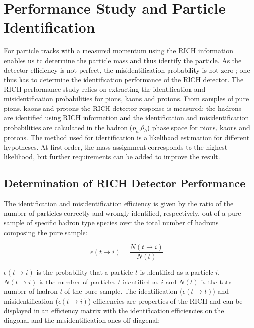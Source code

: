 
\chapter{Performance Study and Particle Identification}
\label{ch:PID} %


For particle tracks with a measured momentum using the RICH information enables us to determine the particle mass and thus identify the particle. As the detector efficiency is not perfect, the misidentification probability is not zero ; one thus has to determine the identification performance of the RICH detector. The RICH performance study relies on extracting the identification and misidentification probabilities for pions, kaons and protons. From samples of pure pions, kaons and protons the RICH detector response is measured: the hadrons are identified using RICH information and the identification and misidentification probabilities are calculated in the hadron ($p_h$,$\theta_h$) phase space for pions, kaons and protons. The method used for identification is a likelihood estimation for different hypotheses. At first order, the mass assignment corresponds to the highest likelihood, but further requirements can be added to improve the result.

\section{Determination of RICH Detector Performance}

The identification and misidentification efficiency is given by the ratio of the number of particles correctly and wrongly identified, respectively, out of a pure sample of specific hadron type species over the total number of hadrons composing the pure sample:

\begin{equation}
    \epsilon(t \rightarrow i) = \frac{N(t \rightarrow i)}{N(t)}
\end{equation}

$\epsilon(t \rightarrow i)$ is the probability that a particle $t$ is identified as a particle $i$, $N(t \rightarrow i)$ is the number of particles $t$ identified as $i$ and $N(t)$ is the total number of hadron $t$ of the pure sample. The identification ($\epsilon(t \rightarrow t)$) and misidentification ($\epsilon(t \rightarrow i)$) efficiencies are properties of the RICH and can be displayed in an efficiency matrix with the identification efficiencies on the diagonal and the misidentification ones off-diagonal:

